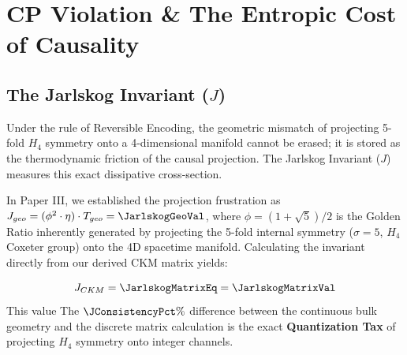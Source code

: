 


\section{CP Violation \& The Entropic Cost of Causality}

\subsection{The Jarlskog Invariant (\texorpdfstring{$J$}{J})}
Under the rule of Reversible Encoding, the geometric mismatch of projecting 5-fold $H_4$ symmetry onto a 4-dimensional manifold cannot be erased; it is stored as the thermodynamic friction of the causal projection. The Jarlskog Invariant ($J$) measures this exact dissipative cross-section.

In Paper III, we established the projection frustration as $J_{geo} = (\phi^2 \cdot \eta) \cdot T_{geo} = \JarlskogGeoVal$, where $\phi = (1+\sqrt{5})/2$ is the Golden Ratio inherently generated by projecting the 5-fold internal symmetry ($\sigma=5$, $H_4$ Coxeter group) onto the 4D spacetime manifold. Calculating the invariant directly from our derived CKM matrix yields:

\begin{equation}
    J_{CKM} = \JarlskogMatrixEq = \JarlskogMatrixVal
\end{equation}
This value \JarlskogMatrixAccText The $\JConsistencyPct\%$ difference between the continuous bulk geometry and the discrete matrix calculation is the exact \textbf{Quantization Tax} of projecting $H_4$ symmetry onto integer channels.





